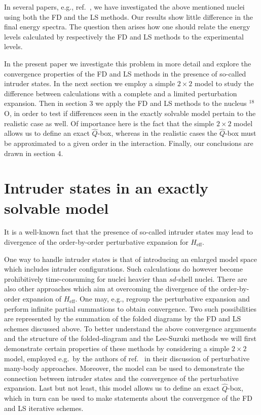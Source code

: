 In several papers, e.g., ref.\ \cite{heho92},
we have investigated the above
mentioned nuclei using both the FD and the LS methods.
Our results show little difference in the final energy spectra.
The question then arises how one should relate the energy levels
calculated by respectively the FD and LS methods to the experimental
levels. 

In the present paper we investigate this problem in more detail
and  explore the convergence properties of the FD and LS methods
in the presence of so-called intruder states.
In the next section  we employ a simple $2\times 2$ model
to study the difference between calculations with a complete and
a limited
perturbation expansion.
Then in section 3
we apply the FD and LS methods to  the nucleus $^{18}$O,
in order to test if differences seen in the exactly solvable
model pertain to the realistic case as well. Of importance
here is the fact that the simple $2\times 2$ model allows
us to define an exact $\hat{Q}$-box, whereas in the realistic
cases the $\hat{Q}$-box must be approximated to a given order
in the interaction. Finally, our conclusions are drawn in
section 4.





\section{Intruder states in an exactly solvable model}

It is a well-known fact that the presence of so-called
intruder states \cite{ko90,sw72}
may lead to divergence of the order-by-order
perturbative expansion
for $H_{\mathrm{eff}}$. 

One way to handle intruder states is that of introducing an
enlarged
model space which includes intruder configurations.  Such calculations
do however become prohibitively time-consuming for nuclei heavier
than $sd$-shell nuclei.
There are also other approaches which aim at overcoming the
divergence of the order-by-order 
expansion of $H_{\mathrm{eff}}$. One may,
e.g.,
regroup the perturbative expansion and perform infinite partial
summations to
obtain convergence. Two such possibilities are
represented by
the summation of the folded
diagrams by the FD and LS schemes discussed
above.
To better understand the above convergence
arguments and the structure of the folded-diagram and
the Lee-Suzuki methods we will
first demonstrate certain properties of these methods
by considering a simple $2\times 2$
model, employed e.g.\ by the authors of ref.\ \cite{eo77}
in their discussion of
perturbative many-body approaches.
Moreover, the model can be used to
demonstrate the connection between intruder states and the
convergence of the perturbative expansion. Last but not least, this
model allows us to define an exact $\hat{Q}$-box, which in turn can be
used to make statements about the convergence of the FD and LS
iterative schemes.

